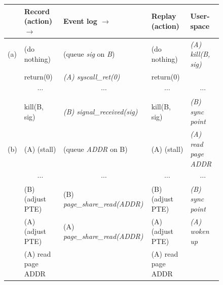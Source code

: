 \begin{figure}[t]
  \scriptsize
  \begin{center}
  \begin{tabular}{llll|l}

    \hline	

    & {\bf Record (action) \hfill $\rightarrow$ }
      & {\bf Event log \hfill $\rightarrow$ }
        & {\bf Replay (action)}
          & {\bf User-space}
            \\

    \hline	

    (a)
    & (do nothing)
      & (queue {\em sig} on {\em B})
        & (do nothing)
          & {\em (A) kill(B, sig)}
            \\

    & return(0)
      & {\em (A) syscall\_ret(0)}
        & return(0)
          &
            \\

    & \multicolumn{1}{c}{ $\cdots$}
      & \multicolumn{1}{c}{ $\cdots$}
        & \multicolumn{1}{c}{ $\cdots$}
          & \multicolumn{1}{|c}{ $\cdots$}
            \\

    & kill(B, sig)
      & {\em (B) signal\_received(sig)}
        & kill(B, sig)
          & {\em (B) sync point}
            \\

    \hline	

    (b)
    & (A) (stall)
      & (queue {\em ADDR} on B)
        & (A) (stall)
          & {\em (A) read page ADDR}
            \\

    & \multicolumn{1}{c}{ $\cdots$}
      & \multicolumn{1}{c}{ $\cdots$}
        & \multicolumn{1}{c}{ $\cdots$}
          & \multicolumn{1}{|c}{ $\cdots$}
            \\

    & (B) (adjust PTE)
      & (B) {\em page\_share\_read(ADDR)}
        & (B) (adjust PTE)
          & {\em (B) sync point}
            \\

    & (A) (adjust PTE)
      & (A) {\em page\_share\_read(ADDR)}
        & (A) (adjust PTE)
          & {\em (A) woken up}
            \\

    & (A) read page ADDR
      & 
        & (A) read page ADDR
          &
            \\

    \hline	


\end{tabular}
\end{center}
\end{figure}
